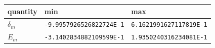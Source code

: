 \begin{tabular}{lll}%
\hline%
\textbf{quantity}&\textbf{min}&\textbf{max}\\%
\hline%
$\delta_m$&\texttt{{-}9.9957926526822724E{-}1}&\texttt{6.1621991627117819E{-}1}\\%
$E_m$&\texttt{{-}3.1402834882109599E{-}1}&\texttt{1.9350240316234081E{-}1}\\%
\hline%
\end{tabular}
